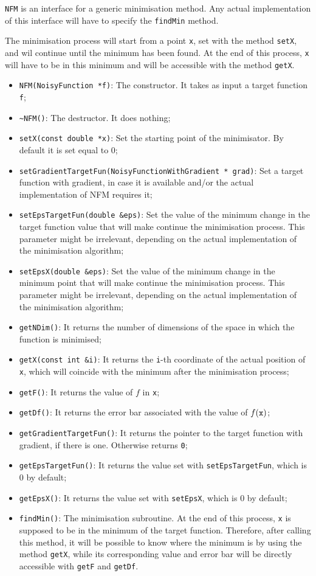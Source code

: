 \documentclass[11pt,a4paper,twoside]{article}
\begin{document}
\verb+NFM+ is an interface for a generic minimisation method.
Any actual implementation of this interface will have to specify the \verb+findMin+ method.

The minimisation process will start from a point \verb+x+, set with the method \verb+setX+, and wil continue until the minimum has been found.
At the end of this process, \verb+x+ will have to be in this minimum and will be accessible with the method \verb+getX+.

\begin{itemize}
   \item \verb+NFM(NoisyFunction *f)+: The constructor. It takes as input a target function \verb+f+;
   \item \verb+~NFM()+: The destructor. It does nothing;
   \item \verb+setX(const double *x)+: Set the starting point of the minimisator. By default it is set equal to $0$;
   \item \verb+setGradientTargetFun(NoisyFunctionWithGradient * grad)+: Set a target function with gradient, in case it is available and/or the actual implementation of NFM requires it;
   \item \verb+setEpsTargetFun(double &eps)+: Set the value of the minimum change in the target function value that will make continue the minimisation process. This parameter might be irrelevant, depending on the actual implementation of the minimisation algorithm;
   \item \verb+setEpsX(double &eps)+: Set the value of the minimum change in the minimum point that will make continue the minimisation process. This parameter might be irrelevant, depending on the actual implementation of the minimisation algorithm;
   \item \verb+getNDim()+: It returns the number of dimensions of the space in which the function is minimised;
   \item \verb+getX(const int &i)+: It returns the \verb+i+-th coordinate of the actual position of \verb+x+, which will coincide with the minimum after the minimisation process;
   \item \verb+getF()+: It returns the value of $f$ in \verb+x+;
   \item \verb+getDf()+: It returns the error bar associated with the value of $f(\verb+x+)$;
   \item \verb+getGradientTargetFun()+: It returns the pointer to the target function with gradient, if there is one. Otherwise returns \verb+0+;
   \item \verb+getEpsTargetFun()+: It returns the value set with \verb+setEpsTargetFun+, which is $0$ by default;
   \item \verb+getEpsX()+: It returns the value set with \verb+setEpsX+, which is $0$ by default;
   \item \verb+findMin()+: The minimisation subroutine. At the end of this process, \verb+x+ is supposed to be in the minimum of the target function. Therefore, after calling this method, it will be possible to know where the minimum is by using the method \verb+getX+, while its corresponding value and error bar will be directly accessible with \verb+getF+ and \verb+getDf+.
\end{itemize}
\end{document}
